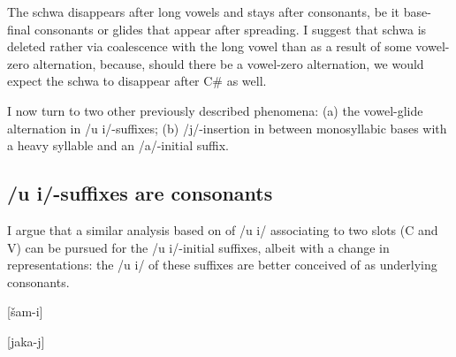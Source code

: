 \documentclass[a4paper, 12pt]{article}
\begin{document}
	\noindent The schwa disappears after long vowels and stays after consonants, be it base-final consonants or glides that appear after spreading. I suggest that schwa is deleted rather via coalescence with the long vowel than as a result of some vowel-zero alternation, because, should there be a vowel-zero alternation, we would expect the schwa to disappear after C\# as well.
	
	I now turn to two other previously described phenomena: (a) the vowel-glide alternation in /u i/-suffixes; (b) /j/-insertion in between monosyllabic bases with a heavy syllable and an /a/-initial suffix.
			
			\subsection{/u i/-suffixes are consonants}
			
	I argue that a similar analysis based on of /u i/ associating to two slots (C and V) can be pursued for the /u i/-initial suffixes, albeit with a change in representations: the /u i/ of these suffixes are better conceived of as underlying consonants.
	
\begin{minipage}[t]{.45\linewidth}
			\ex\label{fig:shami} {[šam-i]} \\
			\xe
\end{minipage}
\hfill
\begin{minipage}[t]{.45\linewidth}
			\ex\label{fig:jakaj} {[jaka-j]} \\
			\xe
\end{minipage}	
	
\end{document}
